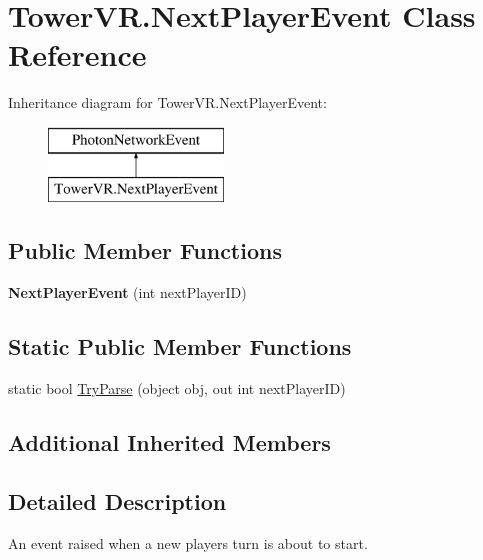 \hypertarget{class_tower_v_r_1_1_next_player_event}{}\section{Tower\+V\+R.\+Next\+Player\+Event Class Reference}
\label{class_tower_v_r_1_1_next_player_event}
Inheritance diagram for Tower\+V\+R.\+Next\+Player\+Event\+:\begin{figure}[H]
\begin{center}
\leavevmode
\includegraphics[height=2.000000cm]{class_tower_v_r_1_1_next_player_event}
\end{center}
\end{figure}
\subsection*{Public Member Functions}
\begin{DoxyCompactItemize}
\item 
{\bfseries Next\+Player\+Event} (int next\+Player\+ID)\hypertarget{class_tower_v_r_1_1_next_player_event_a03b2f88c0362a6cbe6a136097ea0709d}{}\label{class_tower_v_r_1_1_next_player_event_a03b2f88c0362a6cbe6a136097ea0709d}

\end{DoxyCompactItemize}
\subsection*{Static Public Member Functions}
\begin{DoxyCompactItemize}
\item 
static bool \hyperlink{class_tower_v_r_1_1_next_player_event_af9e780f7c4231e70f18c90b1911d067d}{Try\+Parse} (object obj, out int next\+Player\+ID)
\end{DoxyCompactItemize}
\subsection*{Additional Inherited Members}


\subsection{Detailed Description}
An event raised when a new player\textquotesingle{}s turn is about to start. 

